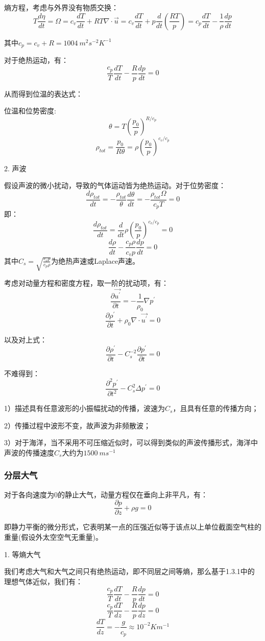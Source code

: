 \documentclass{article}
\begin{document}
熵方程，考虑与外界没有物质交换：
$$T\frac{d\eta}{dt}=\Omega=c_v\frac{dT}{dt}+RT\nabla\cdot\vec{u}=c_v\frac{dT}{dt}+p\frac{d}{dt}\left(\frac{RT}{p}\right)=c_p\frac{dT}{dt}-\frac{1}{\rho}\frac{dp}{dt}$$

其中$c_p = c_v+R=1004 \ m^2s^{-2}K^{-1}$

对于绝热运动，有：
$$\frac{c_p}{T}\frac{dT}{dt}-\frac{R}{p}\frac{dp}{dt}=0$$

从而得到位温的表达式：

位温和位势密度:
$$\theta=T\left(\frac{p_0}{p}\right)^{R/c_p}$$
$$\rho_{tot} =\frac{p_0}{R\theta}=\rho\left(\frac{p_0}{p}\right)^{c_v/c_p}$$

2. 声波

假设声波的微小扰动，导致的气体运动皆为绝热运动。对于位势密度：
$$\frac{d\rho_{tot}}{dt}=-\frac{\rho_{tot}}{\theta}\frac{d\theta}{dt}=-\frac{\rho_{tot}\Omega}{c_pT}=0$$
即：
$$\frac{d\rho_{tot}}{dt}=\frac{d}{dt}\rho\left(\frac{p_0}{p}\right)^{c_v/c_p}=0$$
$$\frac{d\rho}{dt}-\frac{c_p\rho}{c_vp}\frac{dp}{dt}=0$$
其中$C_s=\sqrt{\frac{c_vp}{c_p\rho}}$为绝热声速或Laplace声速。

考虑对动量方程和密度方程，取一阶的扰动项，有：
$$\frac{\partial \vec{u^{\prime}}}{\partial t}=-\frac{1}{\rho_0}\nabla p^{\prime}$$
$$\frac{\partial\rho^{\prime}}{\partial t}+\rho_0\nabla\cdot\vec{u^{\prime}}=0$$

以及对上式：
$$\frac{\partial\rho^{\prime}}{\partial t}-C_s^{-2}\frac{\partial p^{\prime}}{\partial t}=0$$

不难得到：
$$\frac{\partial^2 p^{\prime}}{\partial t^2}-C_s^2\Delta p^{\prime}=0$$

1）描述具有任意波形的小振幅扰动的传播，波速为$C_s$，且具有任意的传播方向；

2）传播过程中波形不变，故声波为非频散波；

3）对于海洋，当不采用不可压缩近似时，可以得到类似的声波传播形式，海洋中声波的传播速度$C_s$大约为$1500 \ ms^{-1}$


\subsubsection{分层大气}

对于各向速度为$0$的静止大气，动量方程仅在垂向上非平凡，有：
$$\frac{\partial p}{\partial z}+\rho g = 0$$

即静力平衡的微分形式，它表明某一点的压强近似等于该点以上单位截面空气柱的重量(假设外太空空气无重量)。

1. 等熵大气

我们考虑大气和大气之间只有绝热运动，即不同层之间等熵，那么基于1.3.1中的理想气体近似，我们有：
$$\frac{c_p}{T}\frac{dT}{dt}-\frac{R}{p}\frac{dp}{dt}=0$$
$$\frac{c_p}{T}\frac{dT}{dz}-\frac{R}{p}\frac{dp}{dz}=0$$
$$\frac{dT}{dz}=-\frac{g}{c_p}\approx10^{-2}Km^{-1}$$
\end{document}
